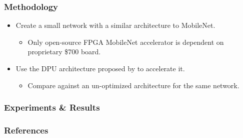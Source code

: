 \documentclass[english]{beamer}
\begin{document}
\begin{frame}
\frametitle{Methodology}
\begin{itemize}
	\item Create a small network with a similar architecture to MobileNet.
	\begin{itemize}
		\item Only open-source FPGA MobileNet
		accelerator\supercite{solovyev2019mobilenet} is dependent on
		proprietary \$700 board.
	\end{itemize}
	\item Use the DPU architecture proposed by
	\citeauthor{mobilenet2019fpga}\supercite{mobilenet2019fpga}
	to accelerate it.
	\begin{itemize}
		\item Compare against an un-optimized architecture for the same network.
	\end{itemize}
\end{itemize}
\end{frame}


\begin{frame}
\frametitle{Experiments \& Results}
\end{frame}


\begin{frame}[allowframebreaks]
\frametitle{References}
\tiny\printbibliography
\end{frame}
\end{document}
